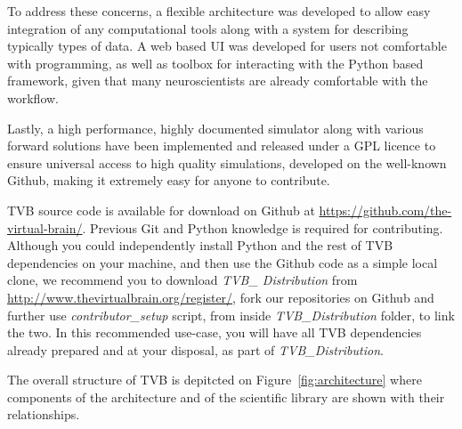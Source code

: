 To address these concerns, a flexible architecture was developed to
allow easy integration of any computational tools along with a system
for describing typically types of data. A web based UI was developed
for users not comfortable with programming, as well as \matlab{} toolbox
for interacting with the Python based framework, given that many
neuroscientists are already comfortable with the \matlab{} workflow.

Lastly, a high performance, highly documented simulator along with
various forward solutions have been implemented and released under a
GPL licence to ensure universal access to high quality simulations, 
developed on the well-known Github, making it extremely easy for 
anyone to contribute.

TVB source code is available for download on Github at
\url{https://github.com/the-virtual-brain/}.  Previous Git and Python knowledge
is required for contributing.  Although you could independently install Python
and the rest of TVB dependencies on your machine, and then use the Github code
as a simple local clone, we recommend you to download \emph{TVB\_ Distribution}
from \url{http://www.thevirtualbrain.org/register/}, fork our repositories on
Github and further use \emph{contributor\_setup} script, from inside \emph{TVB\_Distribution} 
folder, to link the two.  In this recommended use-case, you will
have all TVB dependencies already prepared and at your disposal, as part of
\emph{TVB\_Distribution}. 


The overall structure of TVB is depitcted on Figure~\ref{fig:architecture} where
components of the architecture and of the scientific library are shown with
their relationships.

